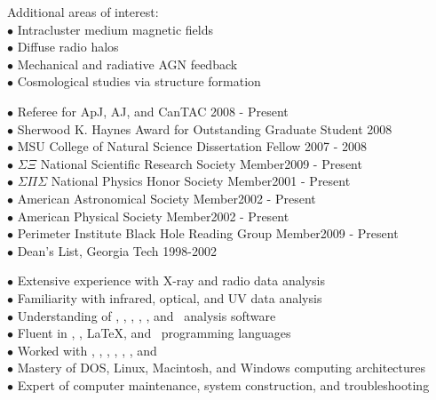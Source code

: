 \documentclass[12pt]{cv}
\begin{document}
\begin{llist}
Additional areas of interest:\\
$\bullet$ Intracluster medium magnetic fields\\
$\bullet$ Diffuse radio halos\\
$\bullet$ Mechanical and radiative AGN feedback\\
$\bullet$ Cosmological studies via structure formation


$\bullet$ Referee for ApJ, AJ, and CanTAC \hfill 2008 - Present\\
$\bullet$ Sherwood K. Haynes Award for Outstanding Graduate Student \hfill 2008\\
$\bullet$ MSU College of Natural Science Dissertation Fellow \hfill 2007 - 2008\\
$\bullet$ $\Sigma \Xi$ National Scientific Research Society Member\hfill 2009 - Present\\
$\bullet$ $\Sigma \Pi \Sigma$ National Physics Honor Society Member\hfill 2001 - Present\\
$\bullet$ American Astronomical Society Member\hfill 2002 - Present\\
$\bullet$ American Physical Society Member\hfill 2002 - Present\\
$\bullet$ Perimeter Institute Black Hole Reading Group Member\hfill 2009 - Present\\
$\bullet$ Dean's List, Georgia Tech \hfill 1998-2002


$\bullet$ Extensive experience with X-ray and radio data analysis\\
$\bullet$ Familiarity with infrared, optical, and UV data analysis\\
$\bullet$ Understanding of \aips, \casa, \ciao, \iraf, \osa, and \sas\ analysis software\\
$\bullet$ Fluent in \html, \idl, \LaTeX, and \perl\ programming languages\\
$\bullet$ Worked with \clang, \flash, \fortran, \mysql, \python, \supmo, and \tcl\\
$\bullet$ Mastery of DOS, Linux, Macintosh, and Windows computing architectures\\
$\bullet$ Expert of computer maintenance, system construction, and troubleshooting


\end{llist}
\end{document}
